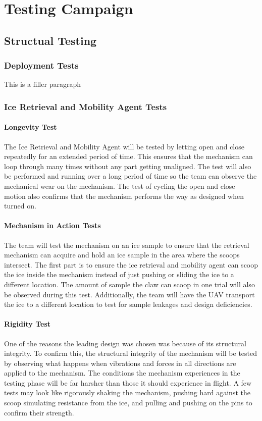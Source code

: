 \chapter{Testing Campaign}

\section{Structual Testing}\label{PL:Testing:Structural}
	\subsection{Deployment Tests}
		This is a filler paragraph

	\subsection{Ice Retrieval and Mobility Agent Tests}
		\subsubsection{Longevity Test}
		The Ice Retrieval and Mobility Agent will be tested by letting open and close repeatedly for an extended period of time. This ensures that the mechanism can loop through many times without any part getting unaligned. The test will also be performed and running over a long period of time so the team can observe the mechanical wear on the mechanism. The test of cycling the open and close motion also confirms that the mechanism performs the way as designed when turned on. 
		\subsubsection{Mechanism in Action Tests}
		The team will test the mechanism on an ice sample to ensure that the retrieval mechanism can acquire and hold an ice sample in the area where the scoops intersect. The first part is to ensure the ice retrieval and mobility agent can scoop the ice inside the mechanism instead of just pushing or sliding the ice to a different location. The amount of sample the claw can scoop in one trial will also be observed during this test. Additionally, the team will have the UAV transport the ice to a different location to test for sample leakages and design deficiencies.
		\subsubsection{Rigidity Test}
		One of the reasons the leading design was chosen was because of its structural integrity. To confirm this, the structural integrity of the mechanism will be tested by observing what happens when vibrations and forces in all directions are applied to the mechanism. The conditions the mechanism experiences in the testing phase will be far harsher than those it should experience in flight. A few tests may look like rigorously shaking the mechanism, pushing hard against the scoop simulating resistance from the ice, and pulling and pushing on the pins to confirm their strength. 

